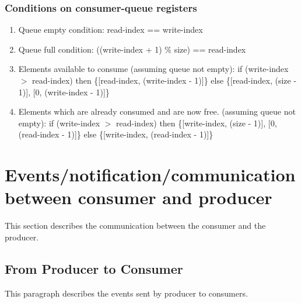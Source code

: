 \documentclass[a4paper,twoside]{report} %
\begin{document}
\subsubsection{Conditions on consumer-queue registers}

\begin{enumerate} 
  \item Queue empty condition: read-index == write-index
  \item Queue full condition: ((write-index + 1) \% size) == read-index 
  \item Elements available to consume \newline
  (assuming queue not empty):\newline
  if (write-index $>$ read-index) \newline
    then \{[read-index, (write-index - 1)]\} \newline
    else \{[read-index, (size - 1)], [0, (write-index - 1)]\}  \newline
  \item Elements which are already consumed and are now free.  \newline
  (assuming queue not empty):  \newline
  if (write-index $>$ read-index) \newline
    then \{[write-index, (size - 1)], [0, (read-index - 1)]\} \newline
    else \{[write-index, (read-index - 1)]\} \newline
\end{enumerate} 

\section{Events/notification/communication between consumer and
producer}
This section describes the communication between the consumer and the
producer.  

\subsection{From Producer to Consumer}
This paragraph describes the events sent by producer to
consumers.
\end{document}
